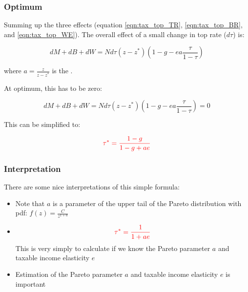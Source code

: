         \subsubsection{Optimum}

            Summing up the three effects (equation \ref{eqn:tax_top_TR}, \ref{eqn:tax_top_BR}, and \ref{eqn:tax_top_WE}). The overall effect of a small change in top rate ($d\tau$) is:
    
            \begin{equation*}
                dM + dB + dW = Nd\tau (z-z^*) \left( 1-g-ea \frac{\tau}{1-\tau} \right)
            \end{equation*}
    
            where $a= \frac{z}{z-z^*}$ is the .
    
            At optimum, this has to be zero:
    
            \begin{equation*}
                dM + dB + dW = Nd\tau (z-z^*) \left( 1-g-ea \frac{\tau}{1-\tau} \right) = 0
            \end{equation*}
    
            This can be simplified to:
    
            \begin{equation}
                \color{red}
                \tau^* = \frac{1-g}{1-g+ae}
            \end{equation}

        \subsubsection{Interpretation}

            There are some nice interpretations of this simple formula:
            \begin{itemize}
                \item Note that $a$ is a parameter of the upper tail of the Pareto distribution with pdf: $f(z)=\frac{C}{z^{1+a}}$
                \item {}
                \begin{equation}
                \color{red}
                    \tau^* = \frac{1}{1+ae}
                \end{equation}
                This is very simply to calculate if we know the Pareto parameter $a$ and taxable income elasticity $e$
                \item Estimation of the Pareto parameter $a$ and taxable income elasticity $e$ is important
            \end{itemize}

